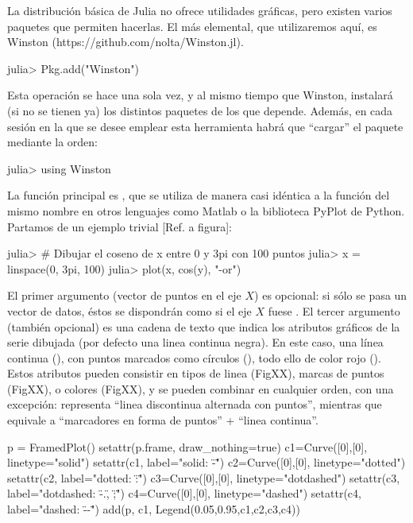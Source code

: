 ﻿\documentclass[spanish]{article}
\begin{document}
La distribución básica de Julia no ofrece utilidades gráficas, pero existen varios paquetes que permiten hacerlas. El más elemental, que utilizaremos aquí, es Winston (https://github.com/nolta/Winston.jl).%

julia> Pkg.add("Winston")

Esta operación se hace una sola vez, y al mismo tiempo que Winston, instalará (si no se tienen ya) los distintos paquetes de los que depende. Además, en cada sesión en la que se desee emplear esta herramienta habrá que ``cargar'' el paquete mediante la orden:

julia> using Winston

La función principal es , que se utiliza de manera casi idéntica a la función del mismo nombre en otros lenguajes como Matlab o la biblioteca PyPlot de Python. Partamos de un ejemplo trivial [Ref. a figura]:

julia> # Dibujar el coseno de x entre 0 y 3pi con 100 puntos
julia> x = linspace(0, 3pi, 100)
julia> plot(x, cos(y), "-or")

El primer argumento (vector de puntos en el eje $X$) es opcional: si sólo se pasa un vector de datos, éstos se dispondrán como si el eje $X$ fuese \code{[1:length(y)]}. El tercer argumento (también opcional) es una cadena de texto que indica los atributos gráficos de la serie dibujada (por defecto una linea continua negra). En este caso, una línea continua (), con puntos marcados como círculos (), todo ello de color rojo (). Estos atributos pueden consistir en tipos de linea (FigXX), marcas de puntos (FigXX), o colores (FigXX), y se pueden combinar en cualquier orden, con una excepción:  representa ``linea discontinua alternada con puntos'', mientras que  equivale a ``marcadores en forma de puntos'' + ``linea continua''.


p = FramedPlot()
setattr(p.frame, draw_nothing=true)
c1=Curve([0],[0], linetype="solid")
setattr(c1, label="solid: \"-\"")
c2=Curve([0],[0], linetype="dotted")
setattr(c2, label="dotted: \":\"")
c3=Curve([0],[0], linetype="dotdashed")
setattr(c3, label="dotdashed: \"-.\", \";\"")
c4=Curve([0],[0], linetype="dashed")
setattr(c4, label="dashed: \"--\"")
add(p, c1, Legend(0.05,0.95,{c1,c2,c3,c4}))
\end{document}
